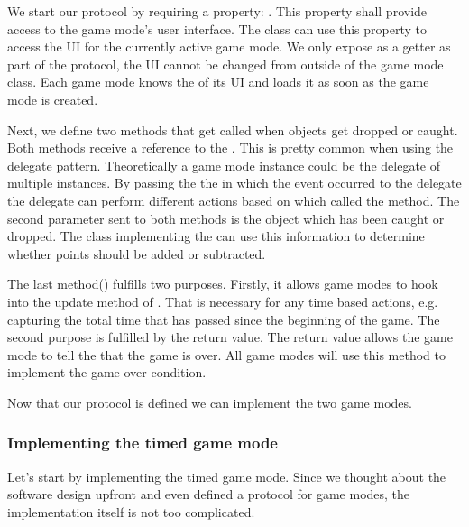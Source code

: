 We start our protocol by requiring a property: . This
property shall provide access to the game mode's user interface. The
 class can use this property to access the UI for the
currently active game mode.
We only expose as a getter as part of the protocol, the UI cannot be changed
from outside of the game mode class. Each game mode knows the \ccbfile{} of its
UI and loads it as soon as the game mode is created.

Next, we define two methods that get called when objects get dropped or caught.
Both methods receive a reference to the . This is pretty
common when using the delegate pattern. Theoretically a game mode instance
could be the delegate of multiple  instances. By passing
the the  in which the event occurred to the delegate the
delegate can perform different actions based on which 
called the method. The second parameter sent to both methods is the object which
has been caught or dropped. The class implementing
the  can use this information to determine whether
points should be added or subtracted.

The last method() fulfills two purposes. Firstly, it
allows game modes to hook into the update method of . That
is necessary for any time based actions, e.g. capturing the total time that
has passed since the beginning of the game. The second purpose is fulfilled by
the  return value. The return value allows the game mode to
tell the  that the game is over. All game modes will use
this method to implement the game over condition.

Now that our protocol is defined we can implement the two game modes. 

\subsubsection{Implementing the timed game mode}
Let's start by implementing the timed game mode. Since we thought about the
software design upfront and even defined a protocol for game modes, the
implementation itself is not too complicated.

